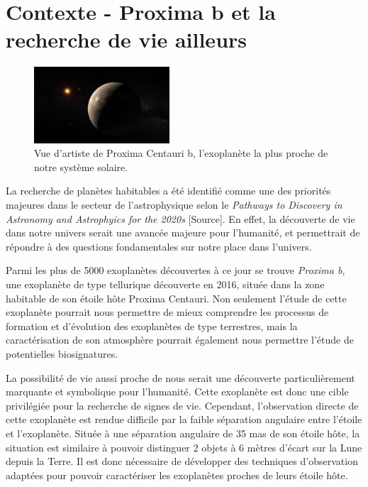 
\section{\centering Contexte - Proxima b et la recherche de vie ailleurs}

\setlength{\columnsep}{1.3em}%
\begin{figure}
    \includegraphics[width=0.45\textwidth]{figures/art_proxb.jpg}
    \caption{Vue d'artiste de Proxima Centauri b, l'exoplanète la plus proche de notre système solaire.}
\end{figure}

La recherche de planètes habitables a été identifié comme une des priorités majeures dans le secteur de l'astrophysique selon le \textsl{Pathways to Discovery in Astronomy and Astrophyics for the 2020s} [Source]. En effet, la découverte de vie dans notre univers serait une avancée majeure pour l'humanité, et permettrait de répondre à des questions fondamentales sur notre place dans l'univers. 

Parmi les plus de 5000 exoplanètes découvertes à ce jour se trouve \textsl{Proxima b}, une exoplanète de type tellurique découverte en 2016, située dans la zone habitable de son étoile hôte Proxima Centauri. Non seulement l'étude de cette exoplanète pourrait nous permettre de mieux comprendre les processus de formation et d'évolution des exoplanètes de type terrestres, mais la caractérisation de son atmosphère pourrait également nous permettre l'étude de potentielles biosignatures.

La possibilité de vie aussi proche de nous serait une découverte particulièrement marquante et symbolique pour l'humanité. Cette exoplanète est donc une cible privilégiée pour la recherche de signes de vie. Cependant, l'observation directe de cette exoplanète est rendue difficile par la faible séparation angulaire entre l'étoile et l'exoplanète. Située à une séparation angulaire de 35 mas de son étoile hôte, la situation est similaire à pouvoir distinguer 2 objets à 6 mètres d'écart sur la Lune depuis la Terre. Il est donc nécessaire de développer des techniques d'observation adaptées pour pouvoir caractériser les exoplanètes proches de leurs étoile hôte.

